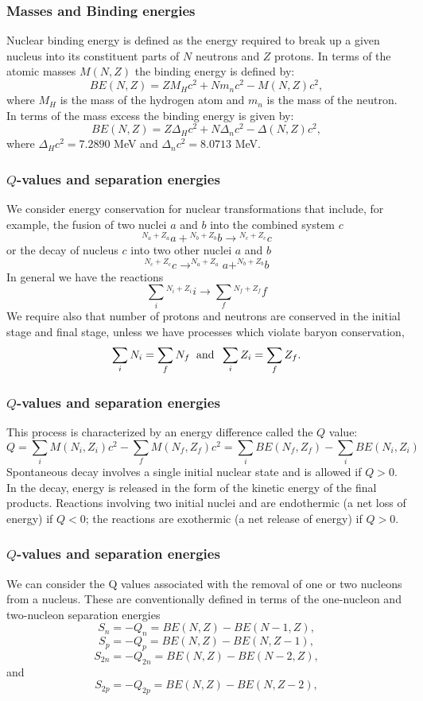 \documentclass[compress]{beamer}
\begin{document}
\frame
{
  \frametitle{Masses and Binding energies}
\begin{small}
{\scriptsize
Nuclear binding energy is defined as the energy required to break up a given nucleus
into its constituent parts of $N$ neutrons and $Z$ protons. In terms of the atomic masses
$M(N, Z)$ the binding energy is defined by:
\[
BE(N, Z) = ZM_H c^2 + Nm_n c^2 - M(N, Z)c^2 ,
\]
where $M_H$ is the mass of the hydrogen atom and $m_n$ is the mass of the neutron.
In terms
of the mass excess the binding energy is given by:
\[
BE(N, Z) = Z\Delta_H c^2 + N\Delta_n c^2 -\Delta(N, Z)c^2 ,
\]
where $\Delta_H c^2 = 7.2890$ MeV and $\Delta_n c^2 = 8.0713$ MeV.

}
\end{small}
}


\frame
{
  \frametitle{$Q$-values and separation energies}
\begin{small}
{\scriptsize
We consider energy conservation for nuclear transformations that include, for
example, the fusion of two nuclei $a$ and $b$ into the combined system $c$
\[
{^{N_a+Z_a}}a+ {^{N_b+Z_b}}b\rightarrow {^{N_c+Z_c}}c
\]
or the decay of nucleus $c$ into two other nuclei $a$ and $b$
\[
^{N_c+Z_c}c \rightarrow  ^{N_a+Z_a}a+ ^{N_b+Z_b}b
\]
In general we have the reactions
\[
\sum_i {^{N_i+Z_i}}i \rightarrow  \sum_f {^{N_f+Z_f}}f
\]
We require also that number of protons and neutrons are conserved in the initial stage and final stage, unless we have processes which violate baryon conservation, 
\[
\sum_iN_i = \sum_f N_f \hspace{0.2cm}\mathrm{and} \hspace{0.2cm}\sum_iZ_i = \sum_f Z_f.
\]
}
\end{small}
}



\frame
{
  \frametitle{$Q$-values and separation energies}
\begin{small}
{\scriptsize
This process is characterized by an energy difference called the $Q$ value:
\[
Q=\sum_iM(N_i, Z_i)c^2-\sum_fM(N_f, Z_f)c^2=\sum_iBE(N_f, Z_f)-\sum_iBE(N_i, Z_i)
\]
Spontaneous decay involves a single initial nuclear state and is allowed if $Q > 0$. In the
decay, energy is released in the form of the kinetic energy of the final products. Reactions
involving two initial nuclei and are endothermic (a net loss of energy) if $Q < 0$; the reactions
are exothermic (a net release of energy) if $Q > 0$.

}
\end{small}
}
\frame
{
  \frametitle{$Q$-values and separation energies}
\begin{small}
{\scriptsize
We can consider the Q values associated with the removal of one or two nucleons from
a nucleus. These are conventionally defined in terms of the one-nucleon and two-nucleon
separation energies
\[
S_n= -Q_n= BE(N,Z)-BE(N-1,Z),
\]
\[
S_p= -Q_p= BE(N,Z)-BE(N,Z-1),
\]
\[
S_{2n}= -Q_{2n}= BE(N,Z)-BE(N-2,Z),
\]
and
\[
S_{2p}= -Q_{2p}= BE(N,Z)-BE(N,Z-2),
\]
}
\end{small}
}
\end{document}
